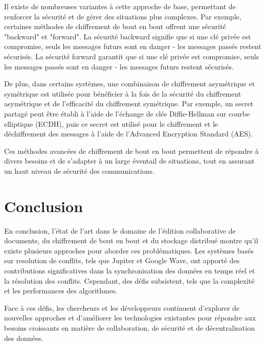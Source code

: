 Il existe de nombreuses variantes à cette approche de base, permettant de renforcer la sécurité et de gérer des situations plus complexes. Par exemple, certaines méthodes de chiffrement de bout en bout offrent une sécurité "backward" et "forward". La sécurité backward signifie que si une clé privée est compromise, seuls les messages futurs sont en danger - les messages passés restent sécurisés. La sécurité forward garantit que si une clé privée est compromise, seuls les messages passés sont en danger - les messages futurs restent sécurisés.

De plus, dans certains systèmes, une combinaison de chiffrement asymétrique et symétrique est utilisée pour bénéficier à la fois de la sécurité du chiffrement asymétrique et de l'efficacité du chiffrement symétrique. Par exemple, un secret partagé peut être établi à l'aide de l'échange de clés Diffie-Hellman sur courbe elliptique (ECDH), puis ce secret est utilisé pour le chiffrement et le déchiffrement des messages à l'aide de l'Advanced Encryption Standard (AES).

Ces méthodes avancées de chiffrement de bout en bout permettent de répondre à divers besoins et de s'adapter à un large éventail de situations, tout en assurant un haut niveau de sécurité des communications.

\section{Conclusion}
En conclusion, l'état de l'art dans le domaine de l'édition collaborative de
documents, du chiffrement de bout en bout et du stockage distribué montre qu'il
existe plusieurs approches pour aborder ces problématiques. Les systèmes basés
sur resolution de conflits, tels que Jupiter et Google Wave, ont apporté des
contributions significatives dans la synchronisation des données en temps réel
et la résolution des conflits. Cependant, des défis subsistent, tels que la
complexité et les performances des algorithmes.

Face à ces défis, les chercheurs et les développeurs continuent d'explorer de nouvelles approches et d'améliorer les technologies existantes pour répondre aux besoins croissants en matière de collaboration, de sécurité et de décentralisation des données.